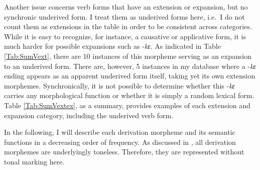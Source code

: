 \begin{table} 
\centering
{}
\caption{Examples of verbal derivation morphemes}
\label{Tab:SumVextex}
\end{table} 


\noindent Another issue concerns verb forms that have an extension or expansion, but no synchronic underived form. I treat them as underived forms here, i.e.\ I do not count them as extensions in the table in order to be consistent across categories. While it is easy to recognize, for instance, a causative or applicative form, it is much harder for possible expansions such as -{\itshape kɛ}.  As indicated in Table \ref{Tab:SumVext}, there are 10 instances of this morpheme serving as an expansion to an underived form. There are, however, 5 instances in my database where a -{\itshape kɛ} ending appears as an apparent underived form itself, taking yet its own extension morphemes. Synchronically, it is not possible to determine whether this -{\itshape kɛ} carries any morphological function or whether it is simply a random lexical form. 
Table \ref{Tab:SumVextex}, as a summary, provides examples of each extension and expansion category, including the underived verb form.

In the following, I will describe each derivation morpheme and its semantic functions in a decreasing order of frequency. As discussed in , all derivation morphemes are underlyingly toneless. Therefore, they are represented without tonal marking here.


